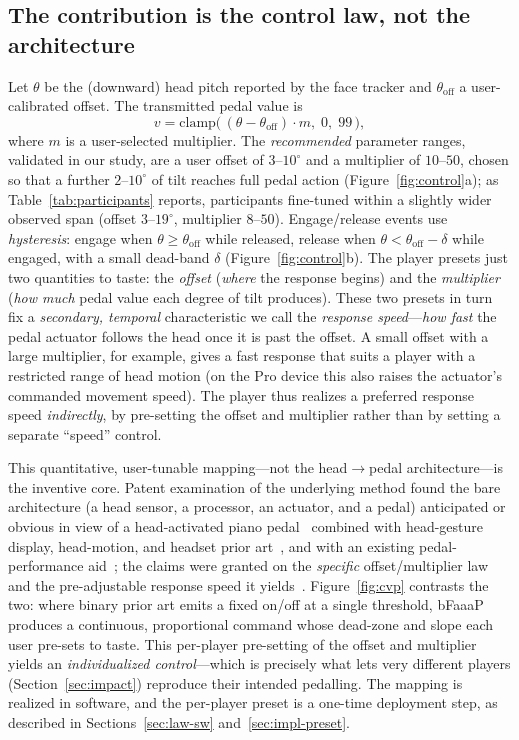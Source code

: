 \subsection{The contribution is the control law, not the architecture}
\label{sec:control-law}
Let $\theta$ be the (downward) head pitch reported by the face tracker and
$\theta_{\mathrm{off}}$ a user-calibrated offset. The transmitted pedal value is
\begin{equation}
v = \mathrm{clamp}\big(\,(\theta-\theta_{\mathrm{off}})\cdot m,\;0,\;99\,\big),
\label{eq:law}
\end{equation}
where $m$ is a user-selected multiplier. The \emph{recommended} parameter ranges,
validated in our study, are a user offset of $3$--$10^\circ$ and a multiplier of
$10$--$50$, chosen so that a further $2$--$10^\circ$ of tilt reaches full pedal
action (Figure~\ref{fig:control}a); as Table~\ref{tab:participants} reports,
participants fine-tuned within a slightly wider observed span (offset
$3$--$19^\circ$, multiplier $8$--$50$). Engage/release events use \emph{hysteresis}: engage
when $\theta\ge\theta_{\mathrm{off}}$ while released, release when
$\theta<\theta_{\mathrm{off}}-\delta$ while engaged, with a small dead-band
$\delta$ (Figure~\ref{fig:control}b). The player presets just two quantities to
taste: the \emph{offset} (\emph{where} the response begins) and the
\emph{multiplier} (\emph{how much} pedal value each degree of tilt produces). These
two presets in turn fix a \emph{secondary, temporal} characteristic we call the
\emph{response speed}---\emph{how fast} the pedal actuator follows the head once it
is past the offset. A small offset with a large multiplier, for example, gives a
fast response that suits a player with a restricted range of head motion (on the Pro
device this also raises the actuator's commanded movement speed). The player thus
realizes a preferred response speed \emph{indirectly}, by pre-setting the offset and
multiplier rather than by setting a separate ``speed'' control.

This quantitative, user-tunable mapping---not the head$\rightarrow$pedal
architecture---is the inventive core. Patent examination of the underlying method
found the bare architecture (a head sensor, a processor, an actuator, and a pedal)
anticipated or obvious in view of a head-activated piano pedal~\cite{canassist}
combined with head-gesture display, head-motion, and headset prior
art~\cite{hmd_jp2017,headset_jp2012,colopl_jp2017,titech_jp2014,alps_us2018}, and
with an existing pedal-performance aid~\cite{yamaha_jp2006};
the claims were granted on the \emph{specific} offset/multiplier law and the
pre-adjustable response speed it yields~\cite{jp6726319,jp7004771}. Figure~\ref{fig:cvp}
contrasts the two: where binary prior art emits a fixed on/off at a single
threshold, bFaaaP produces a continuous, proportional command whose dead-zone and
slope each user pre-sets to taste. This per-player pre-setting of the offset and
multiplier yields an \emph{individualized control}---which is precisely what lets
very different players (Section~\ref{sec:impact}) reproduce their intended
pedalling. The mapping is realized in software, and the per-player preset is a
one-time deployment step, as described in Sections~\ref{sec:law-sw}
and~\ref{sec:impl-preset}.

